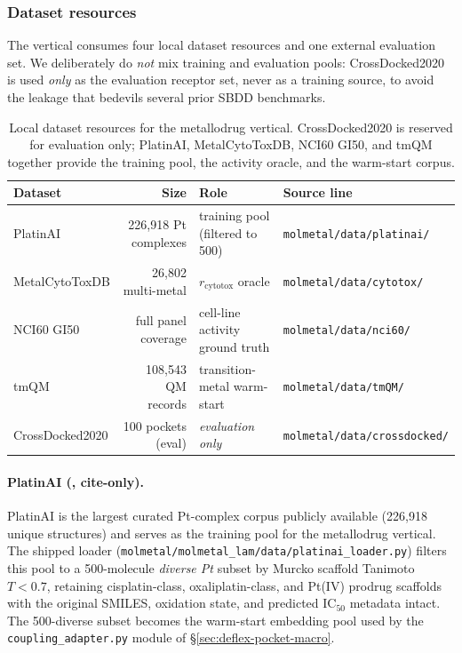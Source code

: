 \subsubsection{Dataset resources}
\label{sec:metallodrug-vertical-data}

The vertical consumes four local dataset resources and one
external evaluation set. We deliberately do \emph{not} mix
training and evaluation pools: CrossDocked2020~\cite{luo2021crossdocked}
is used \emph{only} as the evaluation receptor set, never as a
training source, to avoid the leakage that bedevils several
prior SBDD benchmarks.

\begin{table}[h]
  \centering
  \caption{Local dataset resources for the metallodrug vertical.
  CrossDocked2020 is reserved for evaluation only; PlatinAI,
  MetalCytoToxDB, NCI60 GI50, and tmQM together provide the
  training pool, the activity oracle, and the warm-start
  corpus.}
  \label{tab:metallodrug-vertical-data}
  \begin{tabular}{lrll}
    \hline
    Dataset & Size & Role & Source line \\
    \hline
    PlatinAI            & 226{,}918 Pt complexes  & training pool (filtered to 500) & \texttt{molmetal/data/platinai/} \\
    MetalCytoToxDB      & 26{,}802 multi-metal    & $r_\text{cytotox}$ oracle       & \texttt{molmetal/data/cytotox/} \\
    NCI60 GI50          & full panel coverage     & cell-line activity ground truth & \texttt{molmetal/data/nci60/} \\
    tmQM                & 108{,}543 QM records    & transition-metal warm-start     & \texttt{molmetal/data/tmQM/} \\
    CrossDocked2020     & 100 pockets (eval)      & \emph{evaluation only}          & \texttt{molmetal/data/crossdocked/} \\
    \hline
  \end{tabular}
\end{table}

\paragraph{PlatinAI (\cite{platinaipaper}, cite-only).}
PlatinAI is the largest curated Pt-complex corpus publicly
available (226{,}918 unique structures) and serves as the
training pool for the metallodrug vertical. The shipped loader
(\texttt{molmetal/molmetal\_lam/data/platinai\_loader.py})
filters this pool to a 500-molecule \emph{diverse Pt}
subset by Murcko scaffold Tanimoto $T < 0.7$, retaining
cisplatin-class, oxaliplatin-class, and Pt(IV) prodrug
scaffolds with the original SMILES, oxidation state, and
predicted IC$_{50}$ metadata intact. The 500-diverse subset
becomes the warm-start embedding pool used by the
\texttt{coupling\_adapter.py} module of
\S\ref{sec:deflex-pocket-macro}.

